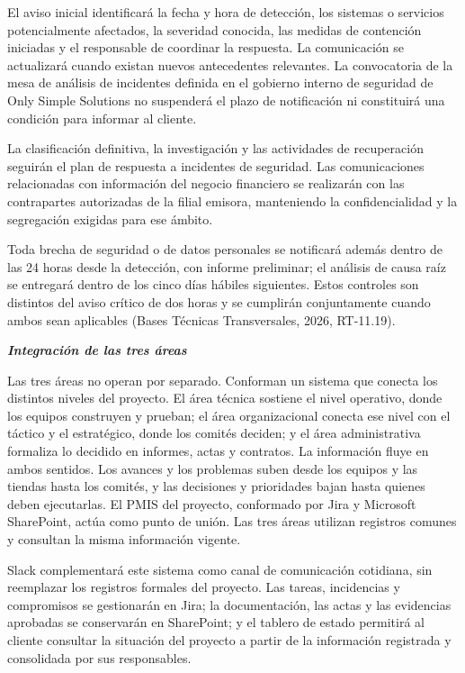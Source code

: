 \documentclass[11pt]{article}
\begin{document}
El aviso inicial identificará la fecha y hora de detección, los sistemas
o servicios potencialmente afectados, la severidad conocida, las medidas
de contención iniciadas y el responsable de coordinar la respuesta. La
comunicación se actualizará cuando existan nuevos antecedentes
relevantes. La convocatoria de la mesa de análisis de incidentes
definida en el gobierno interno de seguridad de Only Simple Solutions no
suspenderá el plazo de notificación ni constituirá una condición para
informar al cliente.

La clasificación definitiva, la investigación y las actividades de
recuperación seguirán el plan de respuesta a incidentes de seguridad.
Las comunicaciones relacionadas con información del negocio financiero
se realizarán con las contrapartes autorizadas de la filial emisora,
manteniendo la confidencialidad y la segregación exigidas para ese
ámbito.

Toda brecha de seguridad o de datos personales se notificará además
dentro de las 24 horas desde la detección, con informe preliminar; el
análisis de causa raíz se entregará dentro de los cinco días hábiles
siguientes. Estos controles son distintos del aviso crítico de dos horas
y se cumplirán conjuntamente cuando ambos sean aplicables (Bases
Técnicas Transversales, 2026, RT-11.19).

\emph{\textbf{Integración de las tres áreas}}

Las tres áreas no operan por separado. Conforman un sistema que conecta
los distintos niveles del proyecto. El área técnica sostiene el nivel
operativo, donde los equipos construyen y prueban; el área
organizacional conecta ese nivel con el táctico y el estratégico, donde
los comités deciden; y el área administrativa formaliza lo decidido en
informes, actas y contratos. La información fluye en ambos sentidos. Los
avances y los problemas suben desde los equipos y las tiendas hasta los
comités, y las decisiones y prioridades bajan hasta quienes deben
ejecutarlas. El PMIS del proyecto, conformado por Jira y Microsoft
SharePoint, actúa como punto de unión. Las tres áreas utilizan registros
comunes y consultan la misma información vigente.

Slack complementará este sistema como canal de comunicación cotidiana,
sin reemplazar los registros formales del proyecto. Las tareas,
incidencias y compromisos se gestionarán en Jira; la documentación, las
actas y las evidencias aprobadas se conservarán en SharePoint; y el
tablero de estado permitirá al cliente consultar la situación del
proyecto a partir de la información registrada y consolidada por sus
responsables.
\end{document}
